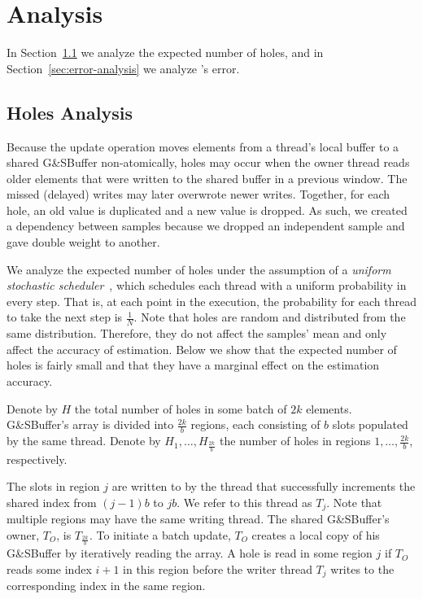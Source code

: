 \chapter{Analysis}
\label{chap:analysis}

In Section~\ref{sec:holes-analysis} we analyze the expected number of holes, and in Section~\ref{sec:error-analysis} we analyze \mysketch's error.

\section{Holes Analysis}
\label{sec:holes-analysis}

Because the update operation moves elements from a thread's local buffer to a shared G\&SBuffer non-atomically, holes may occur when the owner thread reads older elements that were written to the shared buffer in a previous window. The missed (delayed) writes may later overwrote newer writes. Together, for each hole, an old value is duplicated and a new value is dropped. As such, we created a dependency between samples because we dropped an independent sample and gave double weight to another. 

We analyze the expected number of holes under the assumption of a \emph{uniform stochastic scheduler}~\cite{alistarh2016lock}, which schedules each thread with a uniform probability in every step. That is, at each point in the execution, the probability for each thread to take the next step is $\frac{1}{N}$. Note that holes are random and distributed from the same distribution. Therefore, they do not affect the samples' mean and only affect the accuracy of estimation. Below we show that the expected number of holes is fairly small and that they have a marginal effect on the estimation accuracy. 

Denote by $H$ the total number of holes in some batch of $2k$ elements. G\&SBuffer's array is divided into $\frac{2k}{b}$ regions, each consisting of $b$ slots populated by the same thread. Denote by $H_1,\dots, H_{\frac{2k}{b}}$ the number of holes in regions $1, \dots, \frac{2k}{b}$, respectively.

The slots in region $j$ are written to by the thread that successfully increments the shared index from $(j-1)b$ to $jb$. We refer to this thread as $T_j$. Note that multiple regions may have the same writing thread. The shared G\&SBuffer's owner, $T_O$, is $T_{\frac{2k}{b}}$. To initiate a batch update, $T_O$ creates a local copy of his G\&SBuffer by iteratively reading the array. A hole is read in some region $j$ if $T_O$ reads some index $i+1$ in this region before the writer thread $T_j$ writes to the corresponding index in the same region.

